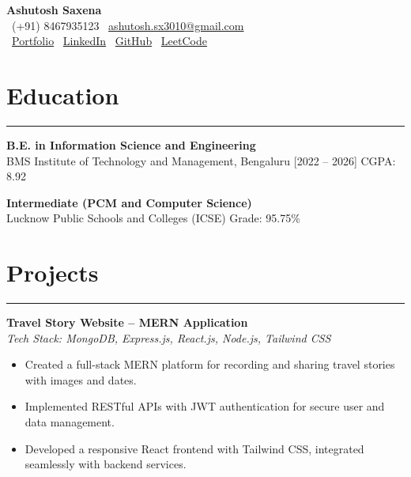\documentclass[a4paper,10pt]{article}
\begin{document}

\begin{center}
\textbf{\Huge Ashutosh Saxena} \\
\vspace{3pt}
\faPhone\ (+91) 8467935123 \quad
\faEnvelope\ \href{mailto:ashutosh.sx3010@gmail.com}{ashutosh.sx3010@gmail.com} \\
\faGlobe\ \href{https://www.ashutoshsaxena.space/}{Portfolio} \quad
\faLinkedin\ \href{https://www.linkedin.com/in/ashutosh-saxena-6b102925b/}{LinkedIn} \quad
\faGithub\ \href{https://github.com/ashutosh-sx/}{GitHub} \quad
\faCode\ \href{https://leetcode.com/u/Ashutosh_1030/}{LeetCode}
\end{center}

\vspace{6pt}
\section*{Education}
\rule{\linewidth}{0.4pt}

\textbf{B.E. in Information Science and Engineering} \\
BMS Institute of Technology and Management, Bengaluru [2022 – 2026] \hfill CGPA: 8.92 

\textbf{Intermediate (PCM and Computer Science)} \\
Lucknow Public Schools and Colleges (ICSE) \hfill Grade: 95.75\%

\vspace{6pt}
\section*{Projects}
\rule{\linewidth}{0.4pt}

\textbf{Travel Story Website – MERN Application} \hfill 
{\large \href{https://github.com/ashutosh-sx/tour_tracker}{\faGithub}} \\
\textit{Tech Stack: MongoDB, Express.js, React.js, Node.js, Tailwind CSS} 
\begin{itemize}[leftmargin=1.2em, itemsep=3pt, topsep=0pt, parsep=0pt]
  \item Created a full-stack MERN platform for recording and sharing travel stories with images and dates.
  \item Implemented RESTful APIs with JWT authentication for secure user and data management.  
  \item Developed a responsive React frontend with Tailwind CSS, integrated seamlessly with backend services.  
\end{itemize}
\end{document}
